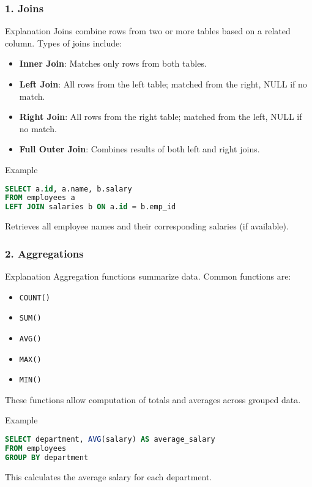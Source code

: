 \documentclass[aspectratio=169]{beamer}
\begin{document}
\begin{frame}[fragile]
    \frametitle{1. Joins}
    \begin{block}{Explanation}
        Joins combine rows from two or more tables based on a related column. Types of joins include:
        \begin{itemize}
            \item \textbf{Inner Join}: Matches only rows from both tables.
            \item \textbf{Left Join}: All rows from the left table; matched from the right, NULL if no match.
            \item \textbf{Right Join}: All rows from the right table; matched from the left, NULL if no match.
            \item \textbf{Full Outer Join}: Combines results of both left and right joins.
        \end{itemize}
    \end{block}
    \begin{block}{Example}
        \begin{lstlisting}[language=SQL]
SELECT a.id, a.name, b.salary
FROM employees a
LEFT JOIN salaries b ON a.id = b.emp_id
        \end{lstlisting}
        Retrieves all employee names and their corresponding salaries (if available).
    \end{block}
\end{frame}

\begin{frame}[fragile]
    \frametitle{2. Aggregations}
    \begin{block}{Explanation}
        Aggregation functions summarize data. Common functions are:
        \begin{itemize}
            \item \texttt{COUNT()}
            \item \texttt{SUM()}
            \item \texttt{AVG()}
            \item \texttt{MAX()}
            \item \texttt{MIN()}
        \end{itemize}
        These functions allow computation of totals and averages across grouped data.
    \end{block}
    \begin{block}{Example}
        \begin{lstlisting}[language=SQL]
SELECT department, AVG(salary) AS average_salary
FROM employees
GROUP BY department
        \end{lstlisting}
        This calculates the average salary for each department.
    \end{block}
\end{frame}
\end{document}
